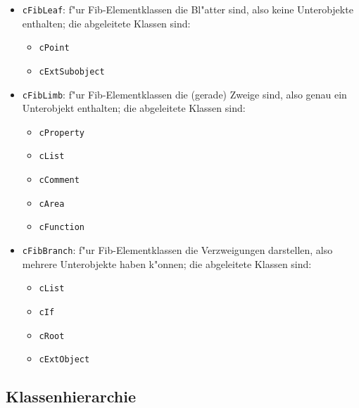 \begin{itemize}
 \item \verb|cFibLeaf|: f"ur Fib-Elementklassen die Bl"atter sind, also keine Unterobjekte enthalten; die abgeleitete Klassen sind:
 \begin{itemize}
  \item \verb|cPoint|
  \item \verb|cExtSubobject|
 \end{itemize}
 \item \verb|cFibLimb|: f"ur Fib-Elementklassen die (gerade) Zweige sind, also genau ein Unterobjekt enthalten; die abgeleitete Klassen sind:
 \begin{itemize}
  \item \verb|cProperty|
  \item \verb|cList|
  \item \verb|cComment|
  \item \verb|cArea|
  \item \verb|cFunction|
 \end{itemize}
 \item \verb|cFibBranch|: f"ur Fib-Elementklassen die Verzweigungen darstellen, also mehrere Unterobjekte haben k"onnen; die abgeleitete Klassen sind:
 \begin{itemize}
  \item \verb|cList|
  \item \verb|cIf|
  \item \verb|cRoot|
  \item \verb|cExtObject|
 \end{itemize}
\end{itemize}

\subsection{Klassenhierarchie}

